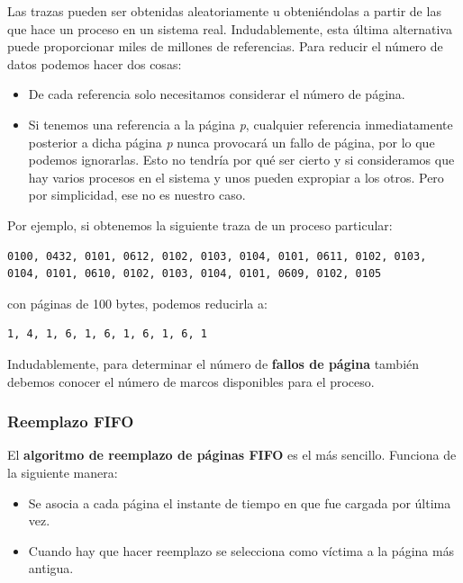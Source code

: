 Las trazas pueden ser obtenidas aleatoriamente u obteniéndolas a partir
de las que hace un proceso en un sistema real. Indudablemente, esta
última alternativa puede proporcionar miles de millones de referencias.
Para reducir el número de datos podemos hacer dos cosas:

\begin{itemize}
\item
  De cada referencia solo necesitamos considerar el número de página.
\item
  Si tenemos una referencia a la página \emph{p}, cualquier referencia
  inmediatamente posterior a dicha página \emph{p} nunca provocará un
  fallo de página, por lo que podemos ignorarlas. Esto no tendría por
  qué ser cierto y si consideramos que hay varios procesos en el sistema
  y unos pueden expropiar a los otros. Pero por simplicidad, ese no es
  nuestro caso.
\end{itemize}

Por ejemplo, si obtenemos la siguiente traza de un proceso particular:

\begin{verbatim}
0100, 0432, 0101, 0612, 0102, 0103, 0104, 0101, 0611, 0102, 0103, 0104, 0101, 0610, 0102, 0103, 0104, 0101, 0609, 0102, 0105
\end{verbatim}

con páginas de 100 bytes, podemos reducirla a:

\begin{verbatim}
1, 4, 1, 6, 1, 6, 1, 6, 1, 6, 1
\end{verbatim}

Indudablemente, para determinar el número de \textbf{fallos de página}
también debemos conocer el número de marcos disponibles para el proceso.

\subsubsection{Reemplazo FIFO}\label{_reemplazo_fifo}

{} {} El \textbf{algoritmo de reemplazo de páginas {}FIFO} es el más
sencillo. Funciona de la siguiente manera:

\begin{itemize}
\item
  Se asocia a cada página el instante de tiempo en que fue cargada por
  última vez.
\item
  Cuando hay que hacer reemplazo se selecciona como víctima a la página
  más antigua.
\end{itemize}

